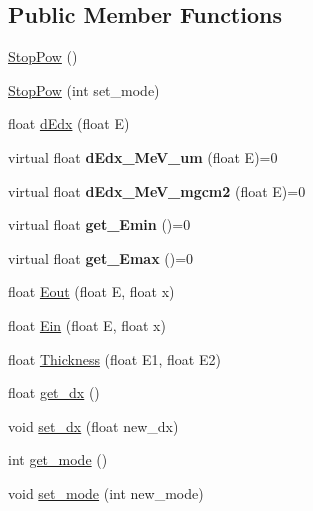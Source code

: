 \subsection*{Public Member Functions}
\begin{DoxyCompactItemize}
\item 
\hyperlink{class_stop_pow_1_1_stop_pow_af65f6d10540615714c734007b06e8fcd}{Stop\-Pow} ()
\item 
\hyperlink{class_stop_pow_1_1_stop_pow_ae497d773c6543a02c1a810a4b705f6a4}{Stop\-Pow} (int set\-\_\-mode)
\item 
float \hyperlink{class_stop_pow_1_1_stop_pow_ad90b7280862a2dca9156b9ebd6992773}{d\-Edx} (float E)
\item 
\hypertarget{class_stop_pow_1_1_stop_pow_af56d6be9eceba6d26eb9f9360f2f14a1}{virtual float {\bfseries d\-Edx\-\_\-\-Me\-V\-\_\-um} (float E)=0}\label{class_stop_pow_1_1_stop_pow_af56d6be9eceba6d26eb9f9360f2f14a1}

\item 
\hypertarget{class_stop_pow_1_1_stop_pow_ae9e6e83483954de70cffbf43f0e2f476}{virtual float {\bfseries d\-Edx\-\_\-\-Me\-V\-\_\-mgcm2} (float E)=0}\label{class_stop_pow_1_1_stop_pow_ae9e6e83483954de70cffbf43f0e2f476}

\item 
\hypertarget{class_stop_pow_1_1_stop_pow_a5f69f88061262399619893c17d956fa2}{virtual float {\bfseries get\-\_\-\-Emin} ()=0}\label{class_stop_pow_1_1_stop_pow_a5f69f88061262399619893c17d956fa2}

\item 
\hypertarget{class_stop_pow_1_1_stop_pow_abef61800dd2420bf2635f152efa73e94}{virtual float {\bfseries get\-\_\-\-Emax} ()=0}\label{class_stop_pow_1_1_stop_pow_abef61800dd2420bf2635f152efa73e94}

\item 
float \hyperlink{class_stop_pow_1_1_stop_pow_ab2bf3d8db19e9c44a79640b1e7835913}{Eout} (float E, float x)
\item 
float \hyperlink{class_stop_pow_1_1_stop_pow_a25d00acea68e066c27219dae57864e9c}{Ein} (float E, float x)
\item 
float \hyperlink{class_stop_pow_1_1_stop_pow_a4596e4cb928d60007b07ff65675ba098}{Thickness} (float E1, float E2)
\item 
float \hyperlink{class_stop_pow_1_1_stop_pow_a92492d239a8a632047d87d447ca8bc69}{get\-\_\-dx} ()
\item 
void \hyperlink{class_stop_pow_1_1_stop_pow_a65260b2b51036a8c7ee82d1156585695}{set\-\_\-dx} (float new\-\_\-dx)
\item 
int \hyperlink{class_stop_pow_1_1_stop_pow_aefe4ad4527d22dde54048cbc94a48a71}{get\-\_\-mode} ()
\item 
void \hyperlink{class_stop_pow_1_1_stop_pow_a661714999f4a47d8a03579d8ef07a172}{set\-\_\-mode} (int new\-\_\-mode)
\end{DoxyCompactItemize}
